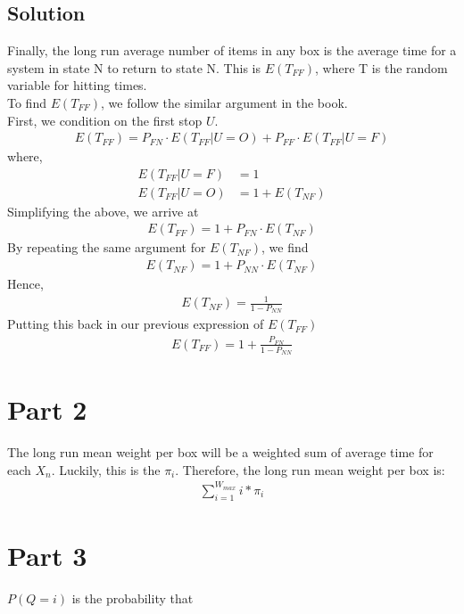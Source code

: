 \documentclass[10pt,a4paper]{article}
\begin{document}
\subsection*{Solution}
Finally, the long run average number of items in any box is the average time for a system in state N to return to state N. This is $ E(T_{FF}) $, where T is the random variable for hitting times. \\
To find $ E(T_{FF}) $, we follow the similar argument in the book. \\
First, we condition on the first stop $ U $. 
\begin{align*}
E(T_{FF}) = P_{FN}\cdot E(T_{FF}|U=O)+P_{FF}\cdot E(T_{FF}|U=F)
\end{align*}
where,\\
\begin{align*}
E(T_{FF}|U=F) &= 1 \\
E(T_{FF}|U=O) &= 1+E(T_{NF})
\end{align*}
Simplifying the above, we arrive at\\
\begin{align*}
E(T_{FF}) = 1+ P_{FN}\cdot E(T_{NF})
\end{align*}
By repeating the same argument for $ E(T_{NF}) $, we find \\
\begin{align*}
E(T_{NF}) = 1+ P_{NN}\cdot E(T_{NF})
\end{align*}
Hence, 
\begin{align*}
E(T_{NF}) = \frac{1}{1 - P_{NN}}
\end{align*}
Putting this back in our previous expression of $ E(T_{FF}) $
\begin{align*}
E(T_{FF}) = 1+ \frac{P_{FN}}{1 - P_{NN}}
\end{align*}


\section{Part 2}
The long run mean weight per box will be a weighted sum of average time for each $X_n$. Luckily, this is the $\pi_i$. Therefore, the long run mean weight per box is:
\begin{align*}
\sum_{i=1}^{W_{max}} i*\pi_i
\end{align*}


\section{Part 3}
$P(Q=i)$ is the probability that  
\end{document}
